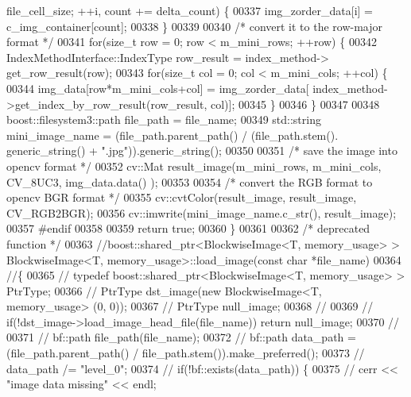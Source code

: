 \begin{DoxyCode}
      file\_cell\_size; ++i, count += delta\_count) \{
00337                 img\_zorder\_data[i] = c\_img\_container[count];
00338         \}
00339 
00340         \textcolor{comment}{/* convert it to the row-major format */}
00341         \textcolor{keywordflow}{for}(\textcolor{keywordtype}{size\_t} row = 0; row < m\_mini\_rows; ++row) \{
00342                 IndexMethodInterface::IndexType row\_result = index\_method->
      get\_row\_result(row);
00343                 \textcolor{keywordflow}{for}(\textcolor{keywordtype}{size\_t} col = 0; col < m\_mini\_cols; ++col) \{
00344                         img\_data[row*m\_mini\_cols+col] = img\_zorder\_data[
      index\_method->get\_index\_by\_row\_result(row\_result, col)];
00345                 \}
00346         \}
00347 
00348     boost::filesystem3::path file\_path = file\_name;
00349     std::string mini\_image\_name = (file\_path.parent\_path() / (file\_path.stem().
      generic\_string() + \textcolor{stringliteral}{".jpg"})).generic\_string();
00350 
00351         \textcolor{comment}{/* save the image into opencv format */}
00352         cv::Mat result\_image(m\_mini\_rows, m\_mini\_cols, CV\_8UC3, img\_data.data()
      );
00353 
00354         \textcolor{comment}{/* convert the RGB format to opencv BGR format */}
00355         cv::cvtColor(result\_image, result\_image, CV\_RGB2BGR);
00356     cv::imwrite(mini\_image\_name.c\_str(), result\_image);
00357 \textcolor{preprocessor}{#endif}
00358 \textcolor{preprocessor}{}
00359         \textcolor{keywordflow}{return} \textcolor{keyword}{true};
00360 \}
00361 
00362 \textcolor{comment}{/* deprecated function */}
00363 \textcolor{comment}{//boost::shared\_ptr<BlockwiseImage<T, memory\_usage> > BlockwiseImage<T,
       memory\_usage>::load\_image(const char *file\_name)}
00364 \textcolor{comment}{//\{}
00365 \textcolor{comment}{//      typedef boost::shared\_ptr<BlockwiseImage<T, memory\_usage> > PtrType;}
00366 \textcolor{comment}{//      PtrType dst\_image(new BlockwiseImage<T, memory\_usage> (0, 0));}
00367 \textcolor{comment}{//      PtrType null\_image;}
00368 \textcolor{comment}{//}
00369 \textcolor{comment}{//      if(!dst\_image->load\_image\_head\_file(file\_name)) return null\_image;}
00370 \textcolor{comment}{//}
00371 \textcolor{comment}{//      bf::path file\_path(file\_name);}
00372 \textcolor{comment}{//      bf::path data\_path = (file\_path.parent\_path() /
       file\_path.stem()).make\_preferred();}
00373 \textcolor{comment}{//      data\_path /= "level\_0";}
00374 \textcolor{comment}{//      if(!bf::exists(data\_path)) \{}
00375 \textcolor{comment}{//              cerr << "image data missing" << endl;}

\end{DoxyCode}
